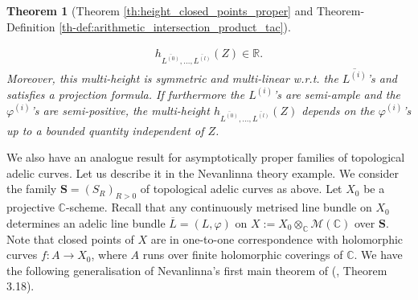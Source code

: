 \documentclass [11pt,reqno]{amsart}
\def\bC{{\mathbb{C}}}
\def\bR{{\mathbb{R}}}
\newcommand{\1}{\mathmybb{1}}
\def\cM{{\mathcal{M}}}
\newtheorem{theo}{Theorem}
\begin{document}
\begin{theo}[Theorem \ref{th:height_closed_points_proper} and Theorem-Definition \ref{th-def:arithmetic_intersection_product_tac}]
\begin{itemize}
	\begin{align*}
	h_{\overline{L^{(0)}},...,\overline{L^{(l)}}}(Z)\in\bR.
	\end{align*}
	Moreover, this multi-height is symmetric and multi-linear w.r.t. the $\overline{L^{(i)}}$'s and satisfies a projection formula. If furthermore the $L^{(i)}$'s are semi-ample and the $\varphi^{(i)}$'s are semi-positive, the multi-height $h_{\overline{L^{(0)}},...,\overline{L^{(l)}}}(Z)$ depends on the $\varphi^{(i)}$'s up to a bounded quantity independent of $Z$.
\end{itemize}
\end{theo}

We also have an analogue result for asymptotically proper families of topological adelic curves. Let us describe it in the Nevanlinna theory example. We consider the family $\mathbf{S}=(S_{R})_{R>0}$ of topological adelic curves as above. Let $X_{0}$ be a projective $\bC$-scheme. Recall that any continuously metrised line bundle on $X_{0}$ determines an adelic line bundle $\overline{L}=(L,\varphi)$ on $X:=X_{0}\otimes_{\bC}\cM(\bC)$ over $\mathbf{S}$. Note that closed points of $X$ are in one-to-one correspondence with holomorphic curves $f: A \to X_{0}$, where $A$ runs over finite holomorphic coverings of $\bC$. We have the following generalisation of Nevanlinna's first main theorem of (\cite{Gubler97}, Theorem 3.18). 
\end{document}
